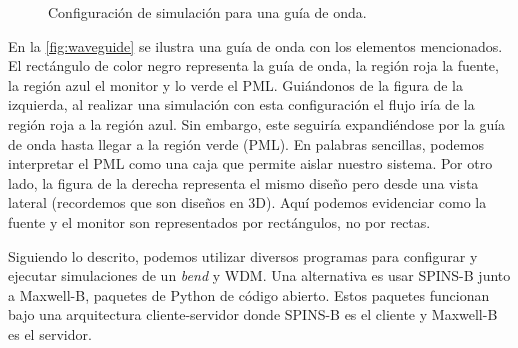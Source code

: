 \begin{figure}[ht]
  \centering
  \hfill

  \caption{Configuración de simulación para una guía de onda.}
  \label{fig:waveguide}
\end{figure}

En la \autoref{fig:waveguide} se ilustra una guía de onda con los elementos mencionados.
El rectángulo de color negro representa la guía de onda, la región roja la fuente, 
la región azul el monitor y lo verde el PML.
Guiándonos de la figura de la izquierda, al realizar una simulación con esta configuración 
el flujo iría de la región roja a la región azul.
Sin embargo, este seguiría expandiéndose por la guía de onda hasta llegar a la región verde (PML).
En palabras sencillas, podemos interpretar el PML como una caja que permite aislar nuestro sistema.
Por otro lado, la figura de la derecha representa el mismo diseño pero desde una vista lateral 
(recordemos que son diseños en 3D).
Aquí podemos evidenciar como la fuente y el monitor son representados por rectángulos, no por rectas.

Siguiendo lo descrito, podemos utilizar diversos programas para configurar y ejecutar 
simulaciones de un \emph{bend} y WDM.
Una alternativa es usar SPINS-B junto a Maxwell-B, paquetes de Python de código
abierto.
Estos paquetes funcionan bajo una arquitectura cliente-servidor donde SPINS-B es el cliente y Maxwell-B es el servidor.

